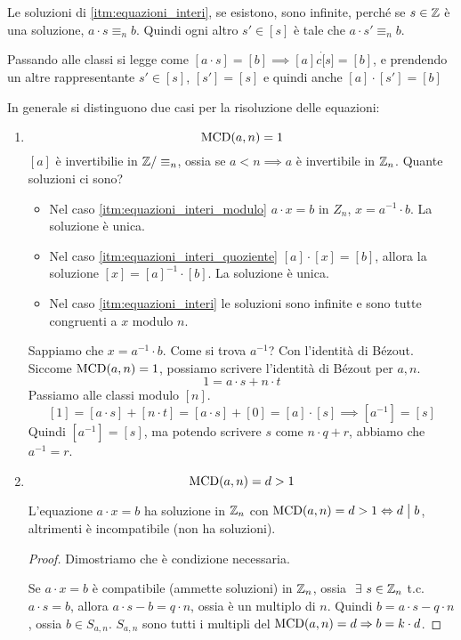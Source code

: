\begin{oss}
Le soluzioni di \ref{itm:equazioni_interi}, se esistono, sono infinite, perch\'e se $s \in \mathbb{Z}$ \`e una soluzione, $a \cdot s \equiv_n b$. Quindi ogni altro $s' \in [s]$ \`e tale che $a \cdot s' \equiv_n b$.

Passando alle classi si legge come $[a \cdot s] = [b] \implies [a] c\dot [s] = [b]$, e prendendo un altre rappresentante $s' \in [s]$, $[s'] = [s]$ e quindi anche $[a] \cdot [s'] = [b]$
\end{oss}

In generale si distinguono due casi per la risoluzione delle equazioni:
\begin{enumerate}
    \item
    \[
    \operatorname{MCD}(a, n) = 1
    \]
    $[a]$ \`e invertibilie in $\mathbb{Z} / \equiv_n$, ossia se $a < n \implies a$ \`e invertibile in $\mathbb{Z}_n$. Quante soluzioni ci sono?
    \begin{itemize}
        \item Nel caso \ref{itm:equazioni_interi_modulo} $a \cdot x = b$ in $Z_n$, $x = a^{-1} \cdot b$. La soluzione \`e unica.
        \item Nel caso \ref{itm:equazioni_interi_quoziente} $[a] \cdot [x] = [b]$, allora la soluzione $[x] = [a]^{-1} \cdot [b]$. La soluzione \`e unica.
        \item Nel caso \ref{itm:equazioni_interi} le soluzioni sono infinite e sono tutte congruenti a $x$ modulo $n$.
    \end{itemize}
    Sappiamo che $x = a^{-1} \cdot b$. Come si trova $a^{-1}$? Con l'identit\`a di B\'ezout. Siccome $\operatorname{MCD}(a,n) = 1$, possiamo scrivere l'identit\`a di B\'ezout per $a, n$.
    \[
    1 = a \cdot s + n \cdot t
    \]
    Passiamo alle classi modulo $[n]$.
    \[
    [1] = [a \cdot s] + [n \cdot t] = [a \cdot s] + [0] = [a] \cdot [s]
    \implies [a^{-1}] = [s]
    \]
    Quindi $[a^{-1}] = [s]$, ma potendo scrivere $s$ come $n \cdot q + r$, abbiamo che $a^{-1} = r$.

    \item 
    \[
    \operatorname{MCD}(a, n) = d > 1
    \]
    \begin{prop}
    L'equazione $a \cdot x = b$ ha soluzione in $\mathbb{Z}_n$ con $\operatorname{MCD}(a, n) = d > 1 \Leftrightarrow d \bigm| b$, altrimenti \`e incompatibile (non ha soluzioni).
    \end{prop}
    \begin{proof}
    Dimostriamo che \`e condizione necessaria.

    Se $a \cdot x = b$ \`e compatibile (ammette soluzioni) in $\mathbb{Z}_n$, ossia $\exists s \in \integers_n$ t.c. $a \cdot s = b$, allora $a \cdot s - b = q \cdot n$, ossia \`e un multiplo di $n$. Quindi $b = a \cdot s - q \cdot n$, ossia $b \in S_{a, n}$. $S_{a,n}$ sono tutti i multipli del $\operatorname{MCD}(a,n) = d \Rightarrow b = k \cdot d$.


\end{proof}
\end{enumerate}

